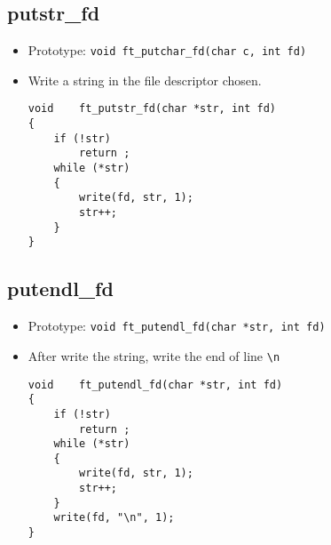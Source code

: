 \documentclass{article}
\begin{document}
	\subsection{putstr\_fd}
		\begin{itemize}[label=$\rightarrow$]
			\item Prototype: \texttt{void    ft\_putchar\_fd(char c, int fd)                                           }
			\item Write a string in the file descriptor chosen.
			\begin{verbatim}
void    ft_putstr_fd(char *str, int fd)                                         
{                                                                               
    if (!str)                                                                   
        return ;                                                                
    while (*str)                                                                
    {                                                                           
        write(fd, str, 1);                                                      
        str++;                                                                  
    }                                                                           
}
			\end{verbatim}
		\end{itemize}
	
	\subsection{putendl\_fd}
		\begin{itemize}[label=$\rightarrow$]
			\item Prototype: \texttt{void    ft\_putendl\_fd(char *str, int fd)                                        }
			\item After write the string, write the end of line \verb|\n|
			\begin{verbatim}
void    ft_putendl_fd(char *str, int fd)                                        
{                                                                               
    if (!str)                                                                   
        return ;                                                                
    while (*str)                                                                
    {                                                                           
        write(fd, str, 1);                                                      
        str++;                                                                  
    }                                                                           
    write(fd, "\n", 1);                                                         
}
			\end{verbatim}
		\end{itemize}
		
\end{document}
